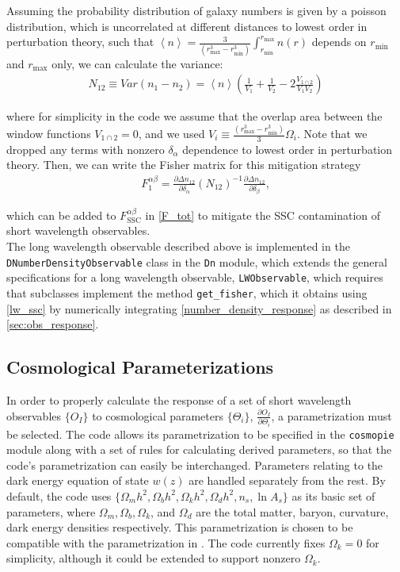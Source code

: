\documentclass[a4paper,11pt]{article}
\begin{document}
Assuming the probability distribution of galaxy numbers is given by a poisson distribution, which is uncorrelated at different distances to lowest order in perturbation theory, such that $\left<n\right>=\frac{3}{(r_\text{max}^3-r_\text{min}^3)}\int_{r_\text{min}}^{r_\text{max}}n(r)$ depends on $r_\text{min}$ and $r_\text{max}$ only, we can calculate the variance:
\begin{align}\label{number_density_variance}
N_{12}\equiv Var\left(n_1-n_2\right) = \left<n\right>\left(\frac{1}{V_1}+\frac{1}{V_2}-2\frac{V_{1\cap 2}}{V_1 V_2}\right)
\end{align}

where for simplicity in the code we assume that the overlap area between the window functions $V_{1\cap 2}=0$, and we used $V_i \equiv \frac{(r_\text{max}^3-r_\text{min}^3)}{3}\Omega_i$. Note that we dropped any terms with nonzero $\delta_\alpha$ dependence to lowest order in perturbation theory. %
Then, we can write the Fisher matrix for this mitigation strategy
\begin{align}\label{lw_ssc}
F_1^{\alpha\beta}=\frac{\partial \Delta n_{12}}{\partial \delta_\alpha}(N_{12})^{-1}\frac{\partial \Delta n_{12}}{\partial \delta_\beta},
\end{align}

which can be added to $F_{\text{SSC}}^{\alpha\beta}$ in \eqref{F_tot} to mitigate the SSC contamination of short wavelength observables. 
\\
The long wavelength observable described above is implemented in the \texttt{DNumberDensityObservable} class in the \texttt{Dn} module, which extends the general specifications for a long wavelength observable, \texttt{LWObservable}, which requires that subclasses implement the method \texttt{get\_fisher}, which it obtains using \eqref{lw_ssc} by numerically integrating  \eqref{number_density_response} as described in \ref{sec:obs_response}.

\subsection{Cosmological Parameterizations}
\label{ssec:cosmo_param}
In order to properly calculate the response of a set of short wavelength observables $\{O_I\}$ to cosmological parameters $\{\Theta_i\}$, $\frac{\partial O_I}{\partial \Theta_i}$, a parametrization must be selected. The code allows its parametrization to be specified in the \texttt{cosmopie} module along with a set of rules for calculating derived parameters, so that the code's parametrization can easily be interchanged. Parameters relating to the dark energy equation of state $w(z)$ are handled separately from the rest. By default, the code uses $\{\Omega_m h^2,\Omega_b h^2,\Omega_k h^2, \Omega_d h^2, n_s,\ln{A_s}\}$ as its basic set of parameters, where $\Omega_m,\Omega_b,\Omega_k$, and $\Omega_d$ are the total matter, baryon, curvature, dark energy densities respectively. This parametrization is chosen to be compatible with the parametrization in \cite{jdem_fom}. The code currently fixes $\Omega_k=0$ for simplicity, although it could be extended to support nonzero $\Omega_k$. 
\end{document}
